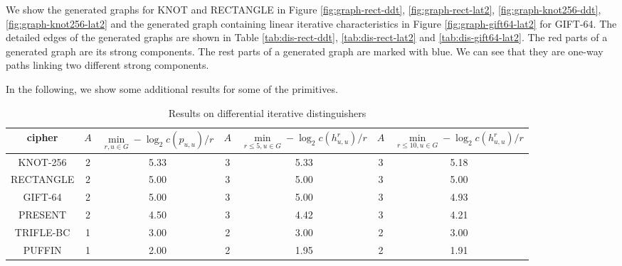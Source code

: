 We show the generated graphs for KNOT and RECTANGLE in Figure \ref{fig:graph-rect-ddt}, \ref{fig:graph-rect-lat2}, \ref{fig:graph-knot256-ddt}, \ref{fig:graph-knot256-lat2} and the generated graph containing linear iterative characteristics in Figure \ref{fig:graph-gift64-lat2} for GIFT-64. The detailed edges of the generated graphs are shown in Table \ref{tab:dis-rect-ddt}, \ref{tab:dis-rect-lat2} and \ref{tab:dis-gift64-lat2}. The red parts of a generated graph are its strong components. The rest parts of a generated graph are marked with blue. We can see that they are one-way paths linking two different strong components. 

In the following, we show some additional results for some of the primitives. 

\begin{table}
	\caption{Results on differential iterative distinguishers}\label{tab:ite-ddt}
	\centering
	\begin{tabular}{|c||c|c||c|c||c|c|}
		\hline
		cipher & $A$ & \tiny$\min\limits_{r,u\in G}-\log_2c(p_{u,u})/r$ & $A$ & \tiny$\min\limits_{r\leq 5,u\in G}-\log_2c(h^r_{u,u})/r$ & $A$ & \tiny$\min\limits_{r\leq 10,u\in G}-\log_2c(h^r_{u,u})/r$ \\
		\hline
		KNOT-256 & 2 & 5.33 & 3 & 5.33 & 3 & 5.18 \\
		\hline
		RECTANGLE & 2 & 5.00 & 3 & 5.00 & 3 & 5.00 \\
		\hline
		GIFT-64 & 2 & 5.00 & 3 & 5.00 & 3 & 4.93 \\
		\hline
		PRESENT & 2 & 4.50 & 3 & 4.42 & 3 & 4.21 \\
		\hline
		TRIFLE-BC & 1 & 3.00 & 2 & 3.00 & 2 & 3.00 \\
		\hline
		PUFFIN & 1 & 2.00 & 2 & 1.95 & 2 & 1.91 \\
		\hline
	\end{tabular}
\end{table}

